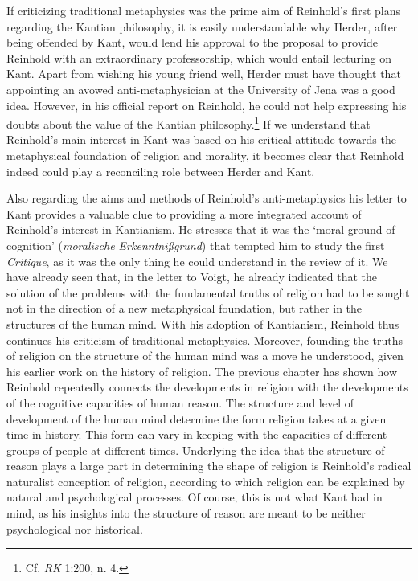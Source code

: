  If criticizing traditional metaphysics was the prime aim of Reinhold's first plans regarding the Kantian philosophy, it is easily understandable why Herder, after being offended by Kant, would lend his approval to the proposal to provide Reinhold with an extraordinary professorship, which would entail lecturing on Kant. Apart from wishing his young friend well, Herder must have thought that appointing an avowed anti{-}metaphysician at the University of Jena was a good idea. However, in his official report on Reinhold, he could not help expressing his doubts about the value of the Kantian philosophy.\footnote{ Cf. \textit{RK} 1:200, n. 4. } If we understand that Reinhold's main interest in Kant was based on his critical attitude towards the metaphysical foundation of religion and morality, it becomes clear that Reinhold indeed could play a reconciling role between Herder and Kant. 

 Also regarding the aims and methods of Reinhold's anti{-}metaphysics his letter to Kant provides a valuable clue to providing a more integrated account of Reinhold's interest in Kantianism. He stresses that it was the `moral ground of cognition' (\textit{moralische Erkenntni\ss{}grund}) that tempted him to study the first \textit{Critique}, as it was the only thing he could understand in the review of it. We have already seen that, in the letter to Voigt, he already indicated that the solution of the problems with the fundamental truths of religion had to be sought not in the direction of a new metaphysical foundation, but rather in the structures of the human mind. With his adoption of Kantianism, Reinhold thus continues his criticism of traditional metaphysics. Moreover, founding the truths of religion on the structure of the human mind was a move he understood, given his earlier work on the history of religion. The previous chapter has shown how Reinhold repeatedly connects the developments in religion with the developments of the cognitive capacities of human reason. The structure and level of development of the human mind determine the form religion takes at a given time in history. This form can vary in keeping with the capacities of different groups of people at different times. Underlying the idea that the structure of reason plays a large part in determining the shape of religion is Reinhold's radical naturalist conception of religion, according to which religion can be explained by natural and psychological processes. Of course, this is not what Kant had in mind, as his insights into the structure of reason are meant to be neither psychological nor historical.  

